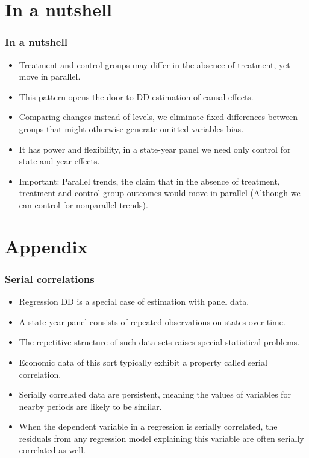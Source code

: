 \documentclass{beamer}
\begin{document}
\section{In a nutshell}
\begin{frame}
\frametitle{In a nutshell}
	\begin{itemize}
		\item Treatment and control groups may differ in the absence of treatment, yet move in parallel. 
		\item This pattern opens the door to DD estimation of causal effects.
		\item Comparing changes instead of levels, we eliminate fixed differences between groups that might otherwise generate omitted variables bias.
		\item It has power and flexibility, in a state-year panel we need only control for state and year effects.
		\item Important: Parallel trends, the claim that in the absence of treatment, treatment and control group outcomes would move in parallel (Although we can control for nonparallel trends).


	\end{itemize}

\end{frame}


\section{Appendix}

\begin{frame}
\frametitle{Serial correlations}
	\begin{itemize}
		\item Regression DD is a special case of estimation with panel data. 
		\item A state-year panel consists of repeated observations on states over time. 
		\item The repetitive structure of such data sets raises special statistical problems.
		\item Economic data of this sort typically exhibit a property called serial correlation.
		\item Serially correlated data are persistent, meaning the values of variables for nearby periods are likely to be similar.
		\item When the dependent variable in a regression is serially correlated, the residuals from any regression model explaining this variable are often serially correlated as well.

	\end{itemize}

\end{frame}
\end{document}
